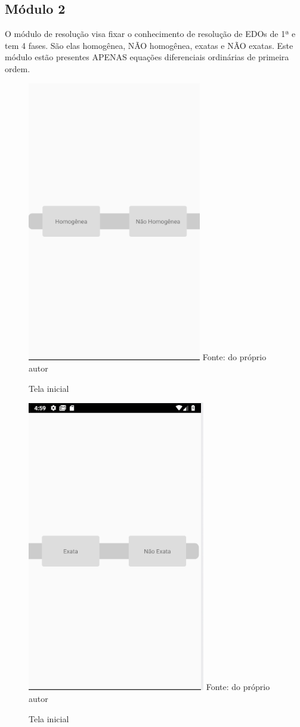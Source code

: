 \subsection[Módulo 2]{Módulo 2}

O módulo de resolução visa fixar o conhecimento de resolução de EDOs de 1ª e tem 4 fases. São elas homogênea, NÃO homogênea, exatas e NÃO exatas. Este módulo estão presentes APENAS equações diferenciais ordinárias de primeira ordem. 

\begin{figure}[H]
\centering
\caption{Tela inicial}
\includegraphics[scale=0.72]{figuras/modo_resolucao_1.png}
\small{Fonte: do próprio autor}
\end{figure}

\begin{figure}[H]
\centering
\caption{Tela inicial}
\includegraphics[scale=0.72]{figuras/modo_resolucao_2.png}
\small{Fonte: do próprio autor}
\end{figure}


